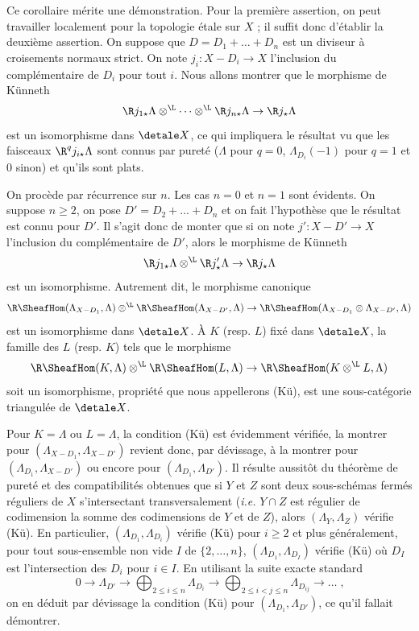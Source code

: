 \documentclass[10pt]{../fichiers-configuration-latex/smfart}
\begin{document}
Ce corollaire mérite une démonstration. Pour la première assertion, on peut
travailler localement pour la topologie étale sur $X$ ; il suffit donc
d'établir la deuxième assertion. On suppose que $D=D_1+\dots+D_n$ est un
diviseur à croisements normaux strict. On note $j_i\colon X-D_i\to X$
l'inclusion du complémentaire de $D_i$ pour tout $i$. Nous allons montrer
que le morphisme de Künneth
\[\R j_{1\star}\Lambda \otimes^{\L}\dots \otimes^{\L} \R
j_{n\star}\Lambda\to \R j_\star\Lambda\]
est un isomorphisme dans $\detale X$, ce qui impliquera le résultat vu que
les faisceaux $\R^q j_{i\star}\Lambda$ sont connus par pureté ($\Lambda$
pour $q=0$, $\Lambda_{D_i}(-1)$ pour $q=1$ et $0$ sinon) et qu'ils sont
plats.

On procède par récurrence sur $n$. Les cas $n=0$ et $n=1$ sont évidents. On
suppose $n\geq 2$, on pose $D'=D_2+\dots+D_n$ et on fait l'hypothèse que le
résultat est connu pour $D'$. Il s'agit donc de monter que si on note
$j'\colon X-D'\to X$ l'inclusion du complémentaire de $D'$, alors le
morphisme de Künneth
\[\R j_{1\star}\Lambda\otimes^{\L} \R j'_\star \Lambda\to \R j_\star\Lambda\]
est un isomorphisme. Autrement dit, le morphisme canonique
\[\R\SheafHom(\Lambda_{X-D_1},\Lambda)\otimes^{\L}
\R\SheafHom(\Lambda_{X-D'},\Lambda)\to \R\SheafHom(\Lambda_{X-D_1}\otimes
\Lambda_{X-D'},\Lambda)\]
est un isomorphisme dans $\detale X$. À $K$ (resp. $L$) fixé dans $\detale
X$, la famille des $L$ (resp. $K$) tels que le morphisme
\[\R\SheafHom(K,\Lambda)\otimes^{\L}
\R\SheafHom(L,\Lambda)\to \R\SheafHom(K\otimes^{\L} L,\Lambda)\]
soit un isomorphisme, propriété que nous appellerons (Kü), est une
sous-catégorie triangulée de $\detale X$.

Pour $K=\Lambda$ ou $L=\Lambda$, la condition (Kü) est évidemment vérifiée,
la montrer pour $(\Lambda_{X-D_1},\Lambda_{X-D'})$ revient donc, par
dévissage, à la montrer pour $(\Lambda_{D_1},\Lambda_{X-D'})$ ou encore
pour $(\Lambda_{D_1},\Lambda_{D'})$. Il résulte aussitôt du théorème de
pureté et des compatibilités obtenues que si $Y$ et $Z$ sont deux
sous-schémas fermés réguliers de $X$ s'intersectant transversalement
(\emph{i.e.} $Y\cap Z$ est régulier de codimension la somme des
codimensions de $Y$ et de $Z$), alors $(\Lambda_Y,\Lambda_Z)$ vérifie (Kü).
En particulier, $(\Lambda_{D_1},\Lambda_{D_i})$ vérifie (Kü) pour $i\geq 2$
et plus généralement, pour tout sous-ensemble non vide $I$ de
$\{2,\dots,n\}$, $(\Lambda_{D_1},\Lambda_{D_I})$ vérifie (Kü) où $D_I$ est
l'intersection des $D_i$ pour $i\in I$. En utilisant la suite exacte
standard
\[0\to \Lambda_{D'}\to \bigoplus_{2\leq i\leq n}\Lambda_{D_i}\to
\bigoplus_{2\leq i<j\leq n} \Lambda_{D_{ij}}\to \dots\;\text{,}\]
on en déduit par dévissage la condition (Kü) pour
$(\Lambda_{D_1},\Lambda_{D'})$, ce qu'il fallait démontrer.
\end{document}
